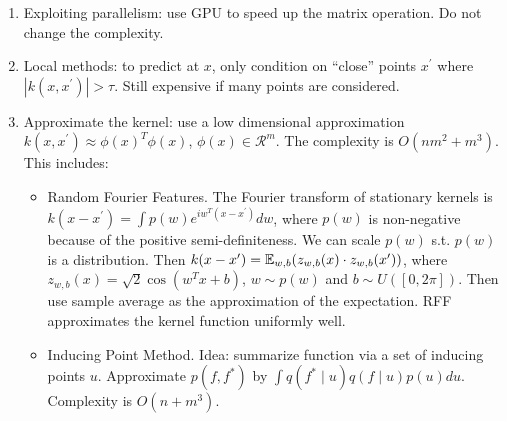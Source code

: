 \begin{enumerate}
    \item Exploiting parallelism: use GPU to speed up the matrix operation. Do not change the complexity.
    \item Local methods: to predict at $x$, only condition on ``close'' points $x^\prime$ where $|k(x,x^\prime)|>\tau$. Still expensive if many points are considered.
    \item Approximate the kernel: use a low dimensional approximation $k(x,x^\prime)\approx \phi(x)^T \phi(x)$, $\phi(x)\in \mathcal{R}^m$. The complexity is $O(nm^2+m^3)$. This includes:
    \begin{itemize}
        \item Random Fourier Features. The Fourier transform of stationary kernels is $k(x-x^\prime) = \int p(w)e^{iw^T(x-x^\prime)} dw$, where $p(w)$ is non-negative because of the positive semi-definiteness. We can scale $p(w)$ s.t. $p(w)$ is a distribution. Then $k(x-x^\prime) = \mathbb{E}_{w,b} (z_{w,b}(x)\cdot z_{w,b}(x^\prime))$, where $z_{w,b}(x)=\sqrt{2}\cos(w^Tx+b)$, $w\sim p(w)$ and $b\sim U([0,2\pi])$. Then use sample average as the approximation of the expectation. RFF approximates the kernel function uniformly well.
        \item Inducing Point Method. Idea: summarize function via a set of inducing points $u$. Approximate $p(f, f^*)$ by $\int q(f^*\mid u)q(f\mid u)p(u) du$. Complexity is $O(n+m^3)$.
    \end{itemize}
\end{enumerate}